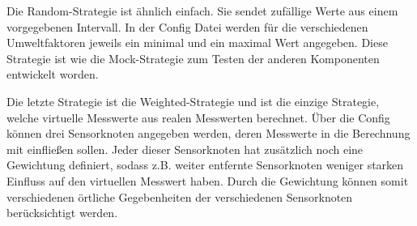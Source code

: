 Die Random-Strategie ist ähnlich einfach. Sie sendet zufällige Werte aus einem vorgegebenen Intervall. In der Config Datei werden für die verschiedenen Umweltfaktoren jeweils ein minimal und ein maximal Wert angegeben. Diese Strategie ist wie die Mock-Strategie zum Testen der anderen Komponenten entwickelt worden.

Die letzte Strategie ist die Weighted-Strategie und ist die einzige Strategie, welche virtuelle Messwerte aus realen Messwerten berechnet. Über die Config können drei Sensorknoten angegeben werden, deren Messwerte in die Berechnung mit einfließen sollen. Jeder dieser Sensorknoten hat zusätzlich noch eine Gewichtung definiert, sodass z.B. weiter entfernte Sensorknoten weniger starken Einfluss auf den virtuellen Messwert haben. Durch die Gewichtung können somit verschiedenen örtliche Gegebenheiten der verschiedenen Sensorknoten berücksichtigt werden.